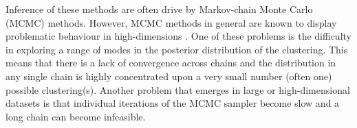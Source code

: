 \documentclass{bioinfo}
\begin{document}




Inference of these methods are often drive by Markov-chain Monte Carlo (MCMC) methods. However, MCMC methods in general are known to display problematic behaviour in high-dimensions \citep{robert2018accelerating, yao2020stacking, chandra2020bayesian}. One of these problems is the difficulty in exploring a range of modes in the posterior distribution of the clustering. This means that there is a lack of convergence across chains and the distribution in any single chain is highly concentrated upon a very small number (often one) possible clustering(s). Another problem that emerges in large or high-dimensional datasets is that individual iterations of the MCMC sampler become slow and a long chain can become infeasible.
\end{document}
